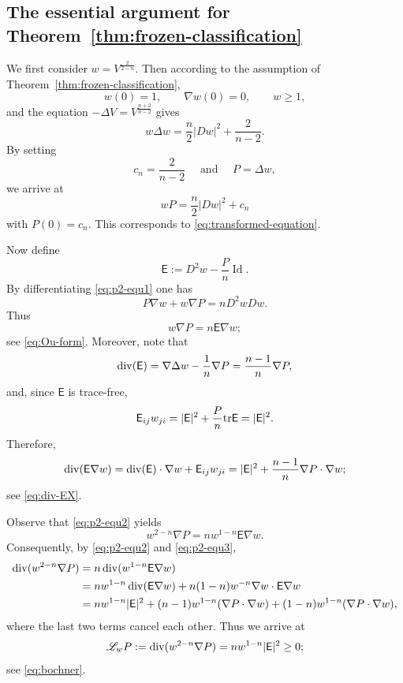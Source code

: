 \documentclass[reqno,12pt]{amsart}
\numberwithin{equation}{section}
\theoremstyle{remark}
\newcommand{\Id}{\operatorname{Id}}
\newcommand{\Lscr}{\mathscr L}
\begin{document}
\subsection{The essential argument for Theorem~\ref{thm:frozen-classification}}
We first consider $w=V^{\frac{2}{2-n}}$. Then according to the assumption of Theorem~\ref{thm:frozen-classification},
$$
w(0)=1, \qquad \nabla w(0)=0, \qquad w\ge 1, 
$$
and the equation $-\Delta V=V^{\frac{n+2}{n-2}}$ gives
$$
w\Delta w = \frac n 2 |Dw|^2 + \frac{2}{n-2}. 
$$
By setting 
$$
c_n=\frac {2}{n-2}\quad \text{ and } \quad P=\Delta w,
$$
we arrive at
\begin{equation}\label{eq:p2-equ1}
    wP=\frac n 2|Dw|^2 + c_n
\end{equation}
with $P(0)=c_n$. This corresponds to  \eqref{eq:transformed-equation}.

Now define 
$$
\mathsf E:= D^2w-\frac P n\Id. 
$$
By differentiating \eqref{eq:p2-equ1} one has
$$
P\nabla w + w\nabla P = n D^2wDw.
$$
Thus
\begin{equation}\label{eq:p2-equ2}
    w\nabla P= n\mathsf  E\nabla w;
\end{equation}
see \eqref{eq:Ou-form}. 
Moreover, note that
$$
{\rm div} (\mathsf E)= \nabla \Delta w - \frac 1 n \nabla P=\frac{n-1}{n}\nabla P,
$$
and, since $\mathsf E$ is trace-free, 
$$
\mathsf E_{ij} w_{ji}= |\mathsf E|^2  + \frac P n {\rm tr} \mathsf E= |\mathsf E|^2.
$$
Therefore, 
\begin{equation}\label{eq:p2-equ3} 
{\rm div} (\mathsf E\nabla w)={\rm div}(\mathsf E)\cdot \nabla w + \mathsf E_{ij} w_{ji}=|\mathsf E|^2+ \frac{n-1}{n} \nabla P\cdot\nabla w;
\end{equation}
see \eqref{eq:div-EX}.

Observe that \eqref{eq:p2-equ2} yields
$$
w^{2-n}\nabla P= nw^{1-n} \mathsf E \nabla w.
$$
Consequently, by \eqref{eq:p2-equ2}  and \eqref{eq:p2-equ3}, 
\begin{align*}
{\rm div}(w^{2-n}\nabla P) 
={} &  n \, {\rm div}(w^{1-n}\mathsf E \nabla w)\\
={} &  n w^{1-n}\, {\rm div}(\mathsf E \nabla w) + n(1-n) w^{-n} \nabla w\cdot \mathsf E\nabla w\\
={} & n w^{1-n}|\mathsf E|^2 + (n-1)w^{1-n}(\nabla P\cdot \nabla w) + (1-n)w^{1-n}(\nabla P\cdot \nabla w),
\end{align*}
where the last two terms cancel each other. Thus we arrive at 
\begin{equation}\label{eq:p2-bochner}
\Lscr_w P:= {\rm div}(w^{2-n}\nabla P)= nw^{1-n}|\mathsf E|^2\ge 0;
\end{equation}
see \eqref{eq:bochner}. 
\end{document}
